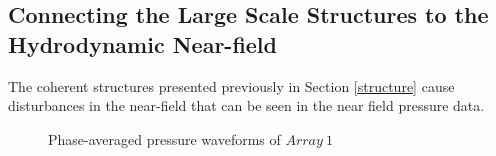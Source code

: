\documentclass[english]{aiaa-tc}
\begin{document}
\subsection{Connecting the Large Scale Structures to the Hydrodynamic Near-field}
The coherent structures presented previously in Section \ref{structure} cause disturbances in the near-field that can be seen in the near field pressure data.
\begin{figure}
\begin{center}
\begin{centering}

\end{centering}
\caption{Phase-averaged pressure waveforms of $Array~1$}
\label{fig:phaseaxialbothM}
\end{center}
\end{figure}
\end{document}
